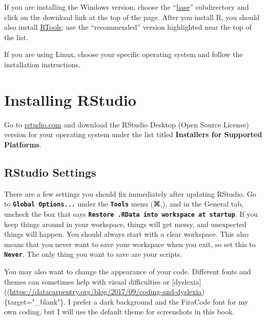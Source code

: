\documentclass[
]{book}
\begin{document}
If you are installing the Windows version, choose the ``\href{https://cran.rstudio.com/bin/windows/base/}{base}'' subdirectory and click on the download link at the top of the page. After you install R, you should also install \href{https://cran.rstudio.com/bin/windows/Rtools/}{RTools}; use the ``recommended'' version highlighted near the top of the list.

If you are using Linux, choose your specific operating system and follow the installation instructions.

\hypertarget{installing-rstudio}{%
\section{Installing RStudio}\label{installing-rstudio}}

Go to \href{https://www.rstudio.com/products/rstudio/download/\#download}{rstudio.com} and download the RStudio Desktop (Open Source License) version for your operating system under the list titled \textbf{Installers for Supported Platforms}.

\hypertarget{rstudio-settings}{%
\subsection{RStudio Settings}\label{rstudio-settings}}

There are a few settings you should fix immediately after updating RStudio. Go to \textbf{\texttt{Global\ Options...}} under the \textbf{\texttt{Tools}} menu (⌘,), and in the General tab, uncheck the box that says \textbf{\texttt{Restore\ .RData\ into\ workspace\ at\ startup}}. If you keep things around in your workspace, things will get messy, and unexpected things will happen. You should always start with a clear workspace. This also means that you never want to save your workspace when you exit, so set this to \textbf{\texttt{Never}}. The only thing you want to save are your scripts.

You may also want to change the appearance of your code. Different fonts and themes can sometimes help with visual difficulties or {[}dyslexia{]}((\url{https://datacarpentry.org/blog/2017/09/coding-and-dyslexia})\{target="\_blank"\}. I prefer a dark background and the FiraCode font for my own coding, but I will use the default theme for screenshots in this book.
\end{document}
